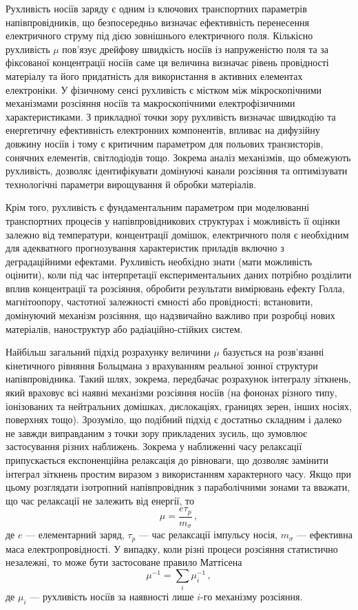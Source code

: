 \documentclass[fleqn,twoside,twocolumn,nofootinbib,showkeys]{revtex4} %
\begin{document}
Рухливість носіїв заряду є одним із ключових транспортних параметрів напівпровідників,
що безпосередньо визначає ефективність перенесення електричного струму під дією зовнішнього електричного поля.
Кількісно рухливість $\mu$ пов’язує дрейфову швидкість носіїв із напруженістю поля та
за фіксованої концентрації носіїв саме ця величина визначає рівень провідності матеріалу
та його придатність для використання в активних елементах електроніки.
У фізичному сенсі рухливість є містком між мікроскопічними механізмами розсіяння носіїв та макроскопічними електрофізичними характеристиками.
З прикладної точки зору рухливість визначає швидкодію та енергетичну ефективність електронних компонентів,
впливає на дифузійну довжину носіїв і тому є критичним параметром для польових транзисторів,  сонячних елементів, світлодіодів тощо.
Зокрема аналіз механізмів, що обмежують рухливість, дозволяє ідентифікувати домінуючі канали розсіяння та оптимізувати технологічні параметри вирощування й обробки матеріалів.

Крім того, рухливість є фундаментальним параметром при моделюванні транспортних процесів у напівпровідникових структурах і можливість її оцінки
залежно від температури, концентрації домішок, електричного поля є необхідним для адекватного прогнозування характеристик приладів включно з деградаційними ефектами.
Рухливість необхідно знати (мати можливість оцінити), коли під час інтерпретації експериментальних даних потрібно
розділити вплив концентрації та розсіяння, обробити результати вимірювань ефекту Голла, магнітоопору, частотної залежності ємності або провідності;
встановити, домінуючий механізм розсіяння, що надзвичайно важливо при розробці нових матеріалів, наноструктур або радіаційно-стійких систем.

Найбільш загальний підхід розрахунку величини $\mu$ базується на розв’язанні кінетичного рівняння Больцмана
з врахуванням реальної зонної структури напівпровідника.
Такий шлях, зокрема, передбачає розрахунок інтегралу зіткнень, який враховує всі наявні механізми розсіяння носіїв
(на фононах різного типу, іонізованих та нейтральних домішках, дислокаціях, границях зерен, інших носіях, поверхнях тощо).
Зрозуміло, що подібний підхід є достатньо складним і далеко не завжди виправданим з точки зору прикладених зусиль, що зумовлює застосування різних наближень.
Зокрема у наближенні часу релаксації припускається експоненційна релаксація до рівноваги, що дозволяє замінити інтеграл зіткнень простим виразом
з використанням характерного часу.
Якщо при цьому розглядати ізотропний напівпровідник з параболічними зонами та вважати, що час релаксації не залежить від енергії, то
\begin{equation}\label{eqG}
  \mu=\frac{e\tau_p}{m_\sigma}\,,
\end{equation}
де
$e$ --- елементарний заряд,
$\tau_p$ --- час релаксації імпульсу носія,
$m_\sigma$ --- ефективна маса електропровідності.
У випадку, коли різні процеси розсіяння статистично незалежні, то може бути застосоване правило Маттісена
\begin{equation}\label{eqM}
  \mu^{-1}=\sum_i \mu_i^{-1}\,,
\end{equation}
де
$\mu_i$ --- рухливість носіїв за наявності лише $i$-го механізму розсіяння.
\end{document}
